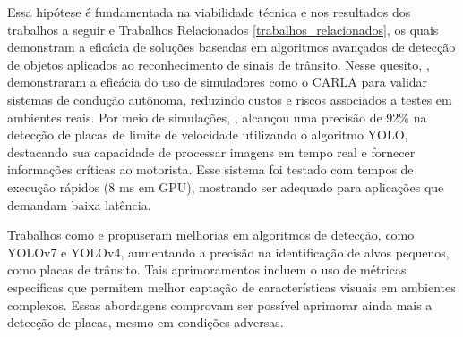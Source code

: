 \documentclass[
	12pt,				%
	oneside, %
	a4paper,			%
	english,			%
	french,				%
	spanish,			%
	brazil				%
	]{abntex2}
\begin{document}




Essa hipótese é fundamentada na viabilidade técnica e nos resultados dos trabalhos a seguir e Trabalhos Relacionados \ref{trabalhos_relacionados}, os quais demonstram a eficácia de soluções baseadas em algoritmos avançados de detecção de objetos aplicados ao reconhecimento de sinais de trânsito. Nesse quesito, , demonstraram a eficácia do uso de simuladores como o CARLA para validar sistemas de condução autônoma, reduzindo custos e riscos associados a testes em ambientes reais. Por meio de simulações, , alcançou uma precisão de 92\% na detecção de placas de limite de velocidade utilizando o algoritmo YOLO, destacando sua capacidade de processar imagens em tempo real e fornecer informações críticas ao motorista. Esse sistema foi testado com tempos de execução rápidos (8 ms em GPU), mostrando ser adequado para aplicações que demandam baixa latência.

Trabalhos como  e  propuseram melhorias em algoritmos de detecção, como YOLOv7 e YOLOv4, aumentando a precisão na identificação de alvos pequenos, como placas de trânsito. Tais aprimoramentos incluem o uso de métricas específicas que permitem melhor captação de características visuais em ambientes complexos. Essas abordagens comprovam ser possível aprimorar ainda mais a detecção de placas, mesmo em condições adversas.
\end{document}
